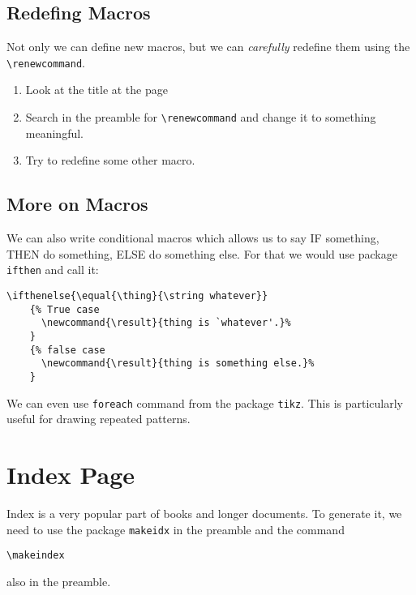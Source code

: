 \documentclass[a4paper,10pt]{report} %
\begin{document}
\subsection{Redefing Macros}
Not only we can define new macros, but we can \emph{carefully} redefine them using the \texttt{\textbackslash renewcommand}.\\

\begin{enumerate}
 \item Look at the title at the page \pageref{contents}
 \item Search in the preamble for \texttt{\textbackslash renewcommand} and change it to something meaningful.
 \item Try to redefine some other macro. 
\end{enumerate}


\subsection{More on Macros} 
 We can also write conditional macros which allows us to say IF something, THEN do something, ELSE do something else. For that we would use package \texttt{ifthen} and call it:
 

\begin{lstlisting}[language={[latex]tex},
    frame=single,basicstyle=\footnotesize,showstringspaces=false, 
     keywordstyle=\color{magenta}, stringstyle=\color{brown}, commentstyle=\color{ForestGreen}]
    \ifthenelse{\equal{\thing}{\string whatever}}
    {% True case
      \newcommand{\result}{thing is `whatever'.}%
    }
    {% false case
      \newcommand{\result}{thing is something else.}%
    }
 \end{lstlisting}
 
 We can even use \texttt{foreach} command from the package \texttt{tikz}. This is particularly useful for drawing repeated patterns.
 
\section{Index Page}
Index is a very popular part of books and longer documents.
To generate it, we need to use the package \texttt{makeidx} in the preamble and the command 
\begin{lstlisting}[language={[latex]tex},
    frame=single,basicstyle=\footnotesize]
     \makeindex
\end{lstlisting}
also in the preamble.\\
\end{document}
